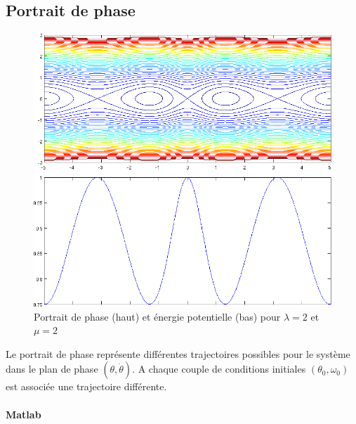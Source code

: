 \documentclass[11pt]{article}
\begin{document}
\subsection{Portrait de phase}
\begin{figure}[h!]
	\centering
	\includegraphics[scale=0.65]{Figures/rapport_figportraitphasemu2.png}
	\caption{Portrait de phase (haut) et énergie potentielle (bas) pour $\lambda=2$ et $\mu=2$}
\end{figure}

Le portrait de phase représente différentes trajectoires possibles pour le système dans le plan de phase $(\theta,\dot{\theta})$. A chaque couple de conditions initiales $(\theta_0, \omega_0)$ est associée une trajectoire différente.

\paragraph{Matlab}
\newpage
\end{document}
